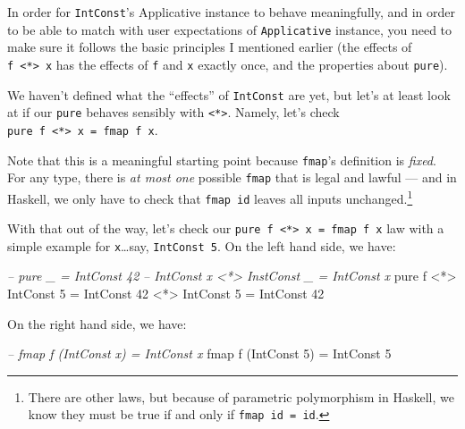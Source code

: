 \documentclass[]{article}
\newenvironment{Shaded}{}{}
\newcommand{\CommentTok}[1]{\textcolor[rgb]{0.38,0.63,0.69}{\textit{#1}}}
\newcommand{\DataTypeTok}[1]{\textcolor[rgb]{0.56,0.13,0.00}{#1}}
\newcommand{\DecValTok}[1]{\textcolor[rgb]{0.25,0.63,0.44}{#1}}
\newcommand{\FunctionTok}[1]{\textcolor[rgb]{0.02,0.16,0.49}{#1}}
\newcommand{\NormalTok}[1]{#1}
\begin{document}
In order for \texttt{IntConst}'s Applicative instance to behave meaningfully,
and in order to be able to match with user expectations of \texttt{Applicative}
instance, you need to make sure it follows the basic principles I mentioned
earlier (the effects of \texttt{f\ \textless{}*\textgreater{}\ x} has the
effects of \texttt{f} and \texttt{x} exactly once, and the properties about
\texttt{pure}).

We haven't defined what the ``effects'' of \texttt{IntConst} are yet, but let's
at least look at if our \texttt{pure} behaves sensibly with
\texttt{\textless{}*\textgreater{}}. Namely, let's check
\texttt{pure\ f\ \textless{}*\textgreater{}\ x\ =\ fmap\ f\ x}.

Note that this is a meaningful starting point because \texttt{fmap}'s definition
is \emph{fixed}. For any type, there is \emph{at most one} possible
\texttt{fmap} that is legal and lawful --- and in Haskell, we only have to check
that \texttt{fmap\ id} leaves all inputs unchanged.\footnote{There are other
  laws, but because of parametric polymorphism in Haskell, we know they must be
  true if and only if \texttt{fmap\ id\ =\ id}.}

With that out of the way, let's check our
\texttt{pure\ f\ \textless{}*\textgreater{}\ x\ =\ fmap\ f\ x} law with a simple
example for \texttt{x}\ldots{}say, \texttt{IntConst\ 5}. On the left hand side,
we have:

\begin{Shaded}
\begin{Highlighting}[]
\CommentTok{-- pure _                     = IntConst 42}
\CommentTok{-- IntConst x <*> InstConst _ = IntConst x}
\NormalTok{pure f }\FunctionTok{<*>} \DataTypeTok{IntConst} \DecValTok{5} \FunctionTok{=} \DataTypeTok{IntConst} \DecValTok{42} \FunctionTok{<*>} \DataTypeTok{IntConst} \DecValTok{5}
                      \FunctionTok{=} \DataTypeTok{IntConst} \DecValTok{42}
\end{Highlighting}
\end{Shaded}

On the right hand side, we have:

\begin{Shaded}
\begin{Highlighting}[]
\CommentTok{-- fmap f (IntConst x) = IntConst x}
\NormalTok{fmap f (}\DataTypeTok{IntConst} \DecValTok{5}\NormalTok{) }\FunctionTok{=} \DataTypeTok{IntConst} \DecValTok{5}
\end{Highlighting}
\end{Shaded}
\end{document}
